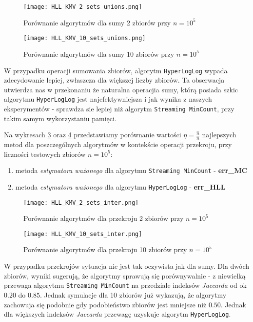 \begin{figure}[h!]
	\texttt{[image: HLL\_KMV\_2\_sets\_unions.png]}
	\centering
	\caption{Porównanie algorytmów dla sumy 2 zbiorów przy $n=10^5$}
	\label{fig:HLL_KMV_2_sets_unions}
\end{figure}

\begin{figure}[h!]
	\texttt{[image: HLL\_KMV\_10\_sets\_unions.png]}
	\centering
	\caption{Porównanie algorytmów dla sumy 10 zbiorów przy $n=10^5$}
	\label{fig:HLL_KMV_10_sets_unions}
\end{figure}
W przypadku operacji sumowania zbiorów, algorytm \texttt{HyperLogLog} wypada zdecydowanie lepiej, zwłaszcza dla większej liczby zbiorów. Ta obserwacja utwierdza nas w przekonaniu że naturalna operacjia sumy, którą posiada szkic algorytmu \texttt{HyperLogLog} jest najefektywniejsza i jak wynika z naszych eksperymentów - sprawdza sie lepiej niż algorytm \texttt{Streaming MinCount}, przy takim samym wykorzystaniu pamięci.

Na wykresach \ref{fig:HLL_KMV_2_sets_inter} oraz \ref{fig:HLL_KMV_10_sets_inter} przedstawiamy porównanie wartości $\eta = \frac{\hat{n}}{n}$ najlepszych metod dla poszczególnych algorytmów w kontekście operacji przekroju, przy liczności testowych zbiorów $n=10^5$:
\begin{enumerate}
	\item metoda \textit{estymatora ważonego} dla algorytmu \texttt{Streaming MinCount} - \textbf{err\_MC}
	\item metoda \textit{estymatora ważonego} dla algorytmu \texttt{HyperLogLog} - \textbf{err\_HLL}
\end{enumerate}

\begin{figure}[h!]
	\texttt{[image: HLL\_KMV\_2\_sets\_inter.png]}
	\centering
	\caption{Porównanie algorytmów dla przekroju 2 zbiorów przy $n=10^5$}
	\label{fig:HLL_KMV_2_sets_inter}
\end{figure}

\begin{figure}[h!]
	\texttt{[image: HLL\_KMV\_10\_sets\_inter.png]}
	\centering
	\caption{Porównanie algorytmów dla przekroju 10 zbiorów przy $n=10^5$}
	\label{fig:HLL_KMV_10_sets_inter}
\end{figure}

W przypadku przekrojów sytuacja nie jest tak oczywista jak dla sumy. Dla dwóch zbiorów, wyniki sugerują, że algorytmy sprawują się porównywalnie - z niewielką przewaga algorytmu \texttt{Streaming MinCount} na przedziale indeksów \textit{Jaccarda} od ok $0.20$ do $0.85$. Jednak symulacje dla 10 zbiorów już wykazują, że algorytmy zachowuja się podobnie gdy podobieństwo zbiorów jest mniejsze niż $0.50$. Jednak dla większych indeksów \textit{Jaccarda} przewagę uzyskuje algorytm \texttt{HyperLogLog}.

